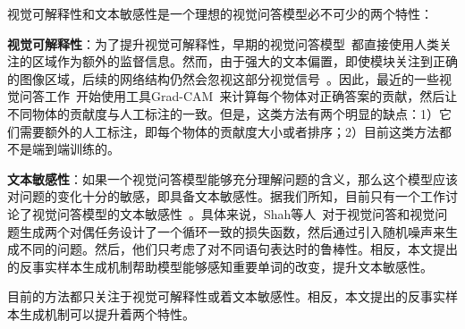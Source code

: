 视觉可解释性和文本敏感性是一个理想的视觉问答模型必不可少的两个特性：
\begin{asparaenum}
\item \textbf{视觉可解释性}：为了提升视觉可解释性，早期的视觉问答模型~\cite{qiao2018exploring,liu2017attention,zhang2019interpretable}都直接使用人类关注的区域作为额外的监督信息。然而，由于强大的文本偏置，即使模块关注到正确的图像区域，后续的网络结构仍然会忽视这部分视觉信号~\cite{selvaraju2019taking}。因此，最近的一些视觉问答工作~\cite{selvaraju2019taking,wu2019self}开始使用工具Grad-CAM~\cite{selvaraju2017grad}来计算每个物体对正确答案的贡献，然后让不同物体的贡献度与人工标注的一致。但是，这类方法有两个明显的缺点：1）它们需要额外的人工标注，即每个物体的贡献度大小或者排序；2）目前这类方法都不是端到端训练的。

\item \textbf{文本敏感性}：如果一个视觉问答模型能够充分理解问题的含义，那么这个模型应该对问题的变化十分的敏感，即具备文本敏感性。据我们所知，目前只有一个工作讨论了视觉问答模型的文本敏感性~\cite{shah2019cycle}。具体来说，Shah等人~\cite{shah2019cycle}对于视觉问答和视觉问题生成两个对偶任务设计了一个循环一致的损失函数，然后通过引入随机噪声来生成不同的问题。然后，他们只考虑了对不同语句表达时的鲁棒性。相反，本文提出的反事实样本生成机制帮助模型能够感知重要单词的改变，提升文本敏感性。
\end{asparaenum}
目前的方法都只关注于视觉可解释性或着文本敏感性。相反，本文提出的反事实样本生成机制可以提升着两个特性。
